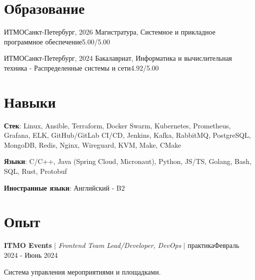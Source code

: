 \documentclass[letterpaper,11pt]{article}
\begin{document}
\section{Образование}
\resumeSubHeadingListStart
  \resumeSubheading
    {ИТМО}{Санкт-Петербург, 2026}
    {Магистратура, Системное и прикладное программное обеспечение}{5.00/5.00}

  \resumeSubheading
    {ИТМО}{Санкт-Петербург, 2024}
    {Бакалавриат, Информатика и вычислительная техника - Распределенные системы и сети}{4.92/5.00}

\resumeSubHeadingListEnd

\section{Навыки}
\resumeSubHeadingListStart
  \small{\item{
    \textbf{Стек}{: Linux, Ansible, Terraform, Docker Swarm, Kubernetes, Prometheus, Grafana, ELK, GitHub/GitLab CI/CD, Jenkins, Kafka, RabbitMQ, PostgreSQL, MongoDB, Redis, Nginx, Wireguard, KVM, Make, CMake }

   \textbf{Языки}{: C/C++, Java (Spring Cloud, Micronaut), Python, JS/TS, Golang, Bash, SQL, Rust, Protobuf }

   \textbf{Иностранные языки}{: Английский - B2}%
  }}
\resumeSubHeadingListEnd

\section{Опыт}
\resumeSubHeadingListStart
  \resumeExperienceHeading
    {\textbf{ITMO Events} $|$ \footnotesize\emph{Frontend Team Lead/Developer, DevOps} $|$ практика}{Февраль 2024 - Июнь 2024}

    {\vspace{-10pt}\small Система управления мероприятиями и площадками.\vspace{-7pt}}

  \resumeItemListStart
  \resumeItemListEnd
\end{document}
